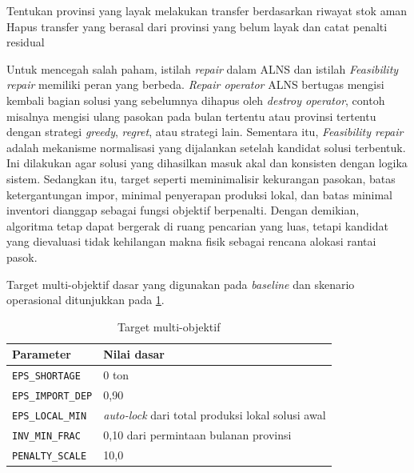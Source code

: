 \documentclass{file/TA-ITS}
\theoremstyle{definition}
\theoremstyle{definition}
\theoremstyle{plain}
\begin{document}
\begin{algorithm}[H]\footnotesize
\caption{Pemulihan Kelayakan Kandidat Solusi \textit{(Feasibility repair)}}
\label{alg:feasibility_repair_concept}
Tentukan provinsi yang layak melakukan transfer berdasarkan riwayat stok aman\;
Hapus transfer yang berasal dari provinsi yang belum layak dan catat penalti residual\;
\end{algorithm}
Untuk mencegah salah paham, istilah \textit{repair} dalam ALNS dan istilah \textit{Feasibility repair} memiliki peran yang berbeda. \textit{Repair operator} ALNS bertugas mengisi kembali bagian solusi yang sebelumnya dihapus oleh \textit{destroy operator}, contoh misalnya mengisi ulang pasokan pada bulan tertentu atau provinsi tertentu dengan strategi \textit{greedy}, \textit{regret}, atau strategi lain. Sementara itu, \textit{Feasibility repair} adalah mekanisme normalisasi yang dijalankan setelah kandidat solusi terbentuk. Ini dilakukan agar solusi yang dihasilkan masuk akal dan konsisten dengan logika sistem. Sedangkan itu, target seperti meminimalisir kekurangan pasokan, batas ketergantungan impor, minimal penyerapan produksi lokal, dan batas minimal inventori dianggap sebagai fungsi objektif berpenalti. Dengan demikian, algoritma tetap dapat bergerak di ruang pencarian yang luas, tetapi kandidat yang dievaluasi tidak kehilangan makna fisik sebagai rencana alokasi rantai pasok.

Target multi-objektif dasar yang digunakan pada \textit{baseline} dan skenario operasional ditunjukkan pada \ref{tab:policy_vector}.

\begin{table}[H]
\centering
\caption{Target multi-objektif}
\label{tab:policy_vector}
\begin{tabular}{@{}ll@{}}
\toprule
\textbf{Parameter} & \textbf{Nilai dasar} \\
\midrule
\texttt{EPS\_SHORTAGE} & 0 ton \\
\texttt{EPS\_IMPORT\_DEP} & 0{,}90 \\
\texttt{EPS\_LOCAL\_MIN} & \textit{auto-lock} dari total produksi lokal solusi awal \\
\texttt{INV\_MIN\_FRAC} & 0{,}10 dari permintaan bulanan provinsi \\
\texttt{PENALTY\_SCALE} & 10{,}0 \\
\bottomrule
\end{tabular}
\end{table}
\end{document}
